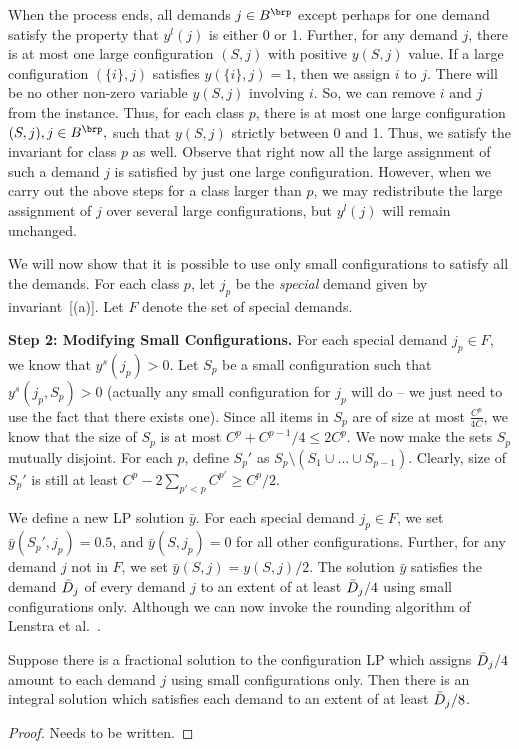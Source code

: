 When the process ends, all demands $j \in B^\brp$  except perhaps for one demand satisfy the property that $y^l(j)$ is either 0 or 1. Further, for any demand $j$, there is at most one large configuration $(S,j)$ with positive $y(S,j)$ value. If a large configuration $(\{i\},j)$ satisfies $y(\{i\},j)=1$, then we assign $i$ to $j$. There will be no other non-zero variable  $y(S,j)$ involving $i$. So, we can remove $i$ and $j$ from the instance. Thus, for each class $p$, there is at most one large configuration $(S,j), j \in B^\brp,$  such that $y(S,j)$ strictly between 0 and 1.  Thus, we  satisfy the invariant for class $p$ as well. Observe that right now all the large assignment of such a demand $j$ is satisfied by just one large configuration. However, when we carry out the
above steps for a class larger than $p$, we may redistribute the large assignment of $j$ over several large configurations, but $y^l(j)$ will remain unchanged.


We will now show that it is possible to use only small configurations to satisfy all the demands.
For each class $p$, let $j_p$ be the {\em special} demand given by invariant~[(a)]. Let $F$ denote the set of special demands.

\medskip \noindent
{\bf Step 2: Modifying Small Configurations.} For each special demand $j_p \in F$, we know that $y^s(j_p) > 0$. Let $S_p$ be a small configuration such that $y^s(j_p, S_p) > 0$ (actually any small configuration for $j_p$ will do -- we just need to use the fact that there exists one).
 Since all items in $S_p$ are of size at most $\frac{C^p}{4C}$, we know that the size of $S_p$ is at most $C^p + C^{p-1}/4 \leq 2C^p$. We now make the sets $S_p$ mutually disjoint. For each $p$, define $S_p'$ as $S_p \setminus (S_1 \cup \ldots \cup S_{p-1})$. Clearly, size of $S_p'$ is still at least $C^p - 2\sum_{p' < p} C^{p'} \geq C^p/2. $

We define a new LP solution ${\bar y}$.
For each special demand $j_p \in F$,
we set ${\bar y}(S_p',j_p) = 0.5$, and ${\bar y}(S,j_p) = 0$ for all other configurations. Further, for any demand $j$ not in $F$, we set ${\bar y}(S,j) =  y(S,j)/2$. The solution ${\bar y}$ satisfies the demand ${\bar D}_j$ of every demand $j$ to an extent of at least ${\bar D}_j/4$ using small configurations only.  Although we can now invoke the rounding algorithm of Lenstra et al.~\cite{}.

\begin{lemma}
\label{lem:lst}
Suppose there is a fractional solution to the configuration LP which assigns ${\bar D}_j/4$ amount to each demand $j$ using small configurations only.
Then there is an integral solution which satisfies each demand to an extent of at least ${\bar D}_j/8$.
\end{lemma}
\begin{proof}
Needs to be written.
\end{proof}

